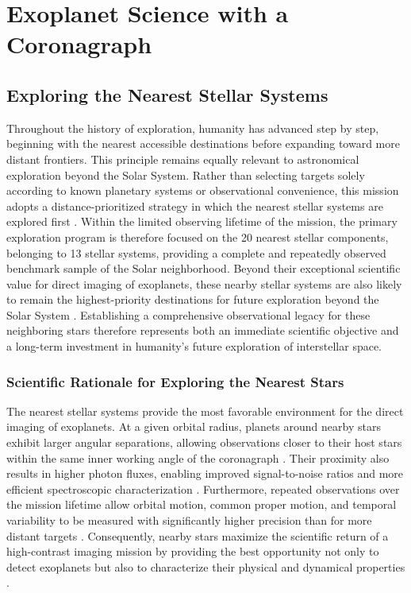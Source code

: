 \chapter{Exoplanet Science with a Coronagraph}\label{app:exoplanets}
\vspace{8mm}

\section{Exploring the Nearest Stellar Systems}
\label{sec:Nearest_system}

Throughout the history of exploration, humanity has advanced step by step, beginning
with the nearest accessible destinations before expanding toward more distant frontiers. This principle remains equally relevant to astronomical exploration beyond the Solar System. Rather than selecting targets solely according to known planetary systems or observational convenience, this mission adopts a distance-prioritized strategy in which the nearest stellar systems are explored first \cite{Henry2018,Gaia2022}. 
Within the limited observing lifetime of the mission, the primary exploration program is therefore focused on the 20 nearest stellar components, belonging to 13 stellar systems, providing a complete and repeatedly observed benchmark sample of the Solar neighborhood. Beyond their exceptional scientific value for direct imaging of exoplanets, these nearby stellar systems are also likely to remain the highest-priority destinations for future exploration beyond the Solar System \cite{Lubin2016}. Establishing a
comprehensive observational legacy for these neighboring stars therefore represents
both an immediate scientific objective and a long-term investment in humanity's future
exploration of interstellar space.

\subsection{Scientific Rationale for Exploring the Nearest Stars}
\label{sec:Rationale_Nearest}

The nearest stellar systems provide the most favorable environment for the direct 
imaging of exoplanets. At a given orbital radius, planets around nearby stars exhibit larger angular separations, allowing observations closer to their host stars within the same inner working angle of the coronagraph \cite{Traub2010}. 
Their proximity also results in higher photon fluxes, enabling improved signal-to-noise ratios and more efficient spectroscopic characterization \cite{LUVOIR2019}. 
Furthermore, repeated observations over the mission lifetime allow orbital motion, common proper motion, and temporal variability to be measured with significantly higher precision than for more distant targets \cite{Macintosh2015}. Consequently, nearby stars maximize the scientific return of a
high-contrast imaging mission by providing the best opportunity not only to detect
exoplanets but also to characterize their physical and dynamical properties
\cite{LUVOIR2019}.

